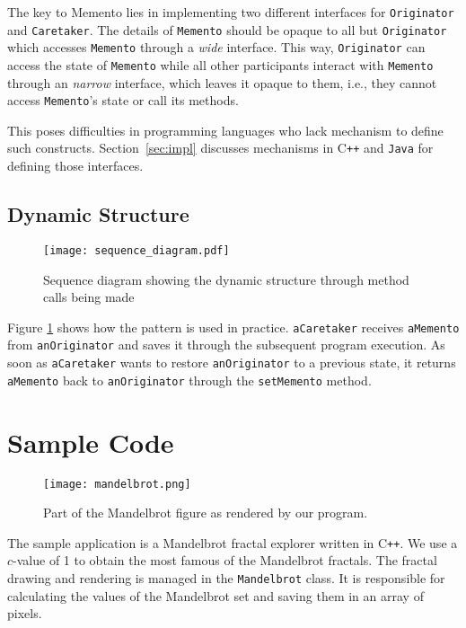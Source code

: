 \documentclass[11pt, a4paper, twoside]{article}
\def\cpp{C{}\texttt{++}}
\begin{document}
	The key to Memento lies in implementing two different interfaces for \verb|Originator| and \verb|Caretaker|. The details of \verb|Memento| should be opaque to all but \verb|Originator| which accesses \verb|Memento| through a \emph{wide} interface. This way, \verb|Originator| can access the state  of \verb|Memento| while all other participants interact with \verb|Memento| through an \emph{narrow} interface, which leaves it opaque to them, i.e., they cannot access \verb|Memento|'s state or call its methods.
	
	This poses difficulties in programming languages who lack mechanism to define such constructs. Section~\ref{sec:impl} discusses mechanisms in \cpp{} and \verb|Java| for defining those interfaces.
	
	\subsection{Dynamic Structure}
	
	\begin{figure}[htb]
		\begin{center}
			\texttt{[image: sequence\_diagram.pdf]}
			\caption{Sequence diagram showing the dynamic structure through method calls being made}
			\label{fig:sequence}
		\end{center}
	\end{figure}
	
	Figure \ref{fig:sequence} shows how the pattern is used in practice. \verb|aCaretaker| receives \verb|aMemento| from \verb|anOriginator| and saves it through the subsequent program execution. As soon as \verb|aCaretaker| wants to restore \verb|anOriginator| to a previous state, it returns \verb|aMemento| back to \verb|anOriginator| through the \verb|setMemento| method.
	
	
	\section{Sample Code}
	
	\begin{figure}[htb]
		\begin{center}
			\texttt{[image: mandelbrot.png]}
			\caption{Part of the Mandelbrot figure as rendered by our program.}
			\label{fig:mandelbrot}
		\end{center}
	\end{figure}
	
	The sample application is a Mandelbrot  fractal explorer written in \cpp. We use a $c$-value of 1 to obtain the most famous of the Mandelbrot fractals. The fractal drawing and rendering is managed in the \verb|Mandelbrot| class. It is responsible for calculating the values of the Mandelbrot set and saving them in an array of pixels.
	
\end{document}
